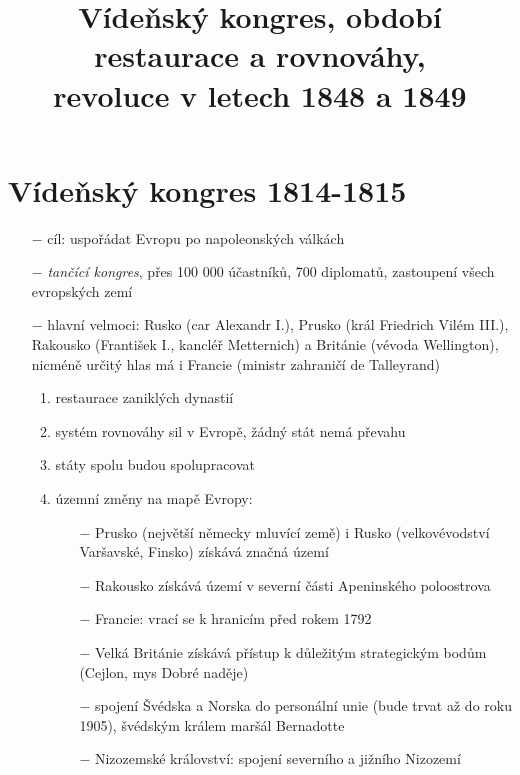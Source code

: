 \documentclass{article}
\title{\vspace{-2cm}Vídeňský kongres, období restaurace a rovnováhy,\\ revoluce v letech 1848 a 1849\vspace{-1.7cm}}
\date{}
\author{}
\begin{document}
\maketitle


\section*{Vídeňský kongres 1814-1815}
\begin{itemize}
    \vspace{-0.5em}
    \setlength\itemsep{0.15em}
    \item[$-$] cíl: uspořádat Evropu po napoleonských válkách
    \item[$-$] \textit{tančící kongres}, přes 100 000 účastníků, 700 diplomatů, zastoupení všech evropských zemí
    \item[$-$] hlavní velmoci: Rusko (car Alexandr I.), Prusko (král Friedrich Vilém III.), Rakousko (František I., kancléř Metternich) a Británie (vévoda Wellington), nicméně určitý hlas má i Francie (ministr zahraničí de Talleyrand)
    \begin{enumerate}
        \vspace{-0.5em}
        \setlength\itemsep{0.15em}
        \item restaurace zaniklých dynastií
        \item systém rovnováhy sil v Evropě, žádný stát nemá převahu
        \item státy spolu budou spolupracovat
        \item územní změny na mapě Evropy:
        \begin{itemize}
            \vspace{-0.5em}
            \setlength\itemsep{0.15em}
            \item[$-$] Prusko (největší německy mluvící země) i Rusko (velkovévodství Varšavské, Finsko) získává značná území
            \item[$-$] Rakousko získává území v severní části Apeninského poloostrova
            \item[$-$] Francie: vrací se k hranicím před rokem 1792
            \item[$-$] Velká Británie získává přístup k důležitým strategickým bodům (Cejlon, mys Dobré naděje)
            \item[$-$] spojení Švédska a Norska do personální unie (bude trvat až do roku 1905), švédským králem maršál Bernadotte
            \item[$-$] Nizozemské království: spojení severního a jižního Nizozemí

\end{itemize}
\end{enumerate}
\end{itemize}
\end{document}

